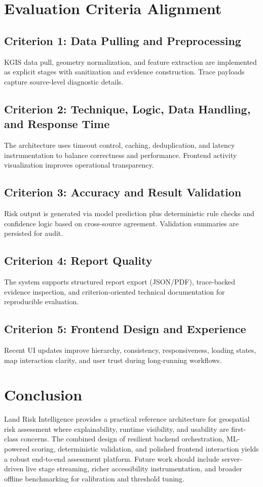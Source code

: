 \documentclass[conference]{IEEEtran}
\begin{document}
\section{Evaluation Criteria Alignment}
\subsection{Criterion 1: Data Pulling and Preprocessing}
KGIS data pull, geometry normalization, and feature extraction are implemented as explicit stages with sanitization and evidence construction. Trace payloads capture source-level diagnostic details.

\subsection{Criterion 2: Technique, Logic, Data Handling, and Response Time}
The architecture uses timeout control, caching, deduplication, and latency instrumentation to balance correctness and performance. Frontend activity visualization improves operational transparency.

\subsection{Criterion 3: Accuracy and Result Validation}
Risk output is generated via model prediction plus deterministic rule checks and confidence logic based on cross-source agreement. Validation summaries are persisted for audit.

\subsection{Criterion 4: Report Quality}
The system supports structured report export (JSON/PDF), trace-backed evidence inspection, and criterion-oriented technical documentation for reproducible evaluation.

\subsection{Criterion 5: Frontend Design and Experience}
Recent UI updates improve hierarchy, consistency, responsiveness, loading states, map interaction clarity, and user trust during long-running workflows.

\section{Conclusion}
Land Risk Intelligence provides a practical reference architecture for geospatial risk assessment where explainability, runtime visibility, and usability are first-class concerns. The combined design of resilient backend orchestration, ML-powered scoring, deterministic validation, and polished frontend interaction yields a robust end-to-end assessment platform. Future work should include server-driven live stage streaming, richer accessibility instrumentation, and broader offline benchmarking for calibration and threshold tuning.
\end{document}
